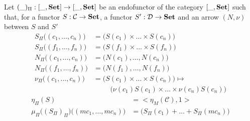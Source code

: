 \documentclass{report}
\newcommand{\prodmon}{\Pi}
\begin{document}
\begin{defn}[The monad $(\_)_\prodmon$]
    Let $(\_)_\prodmon : [\_, \bf Set] \rightarrow [\_,\bf Set]$ be an endofunctor of the category $ [\_, \bf Set] $ such that, for a functor $S : \mathcal{C} \rightarrow \bf Set$, a functor $S' : \mathcal{D} \rightarrow \bf Set$ and an arrow $(N,\nu)$ between $S$ and $S'$
    \begin{align*}
        S_\prodmon\big((c_1,\dots,c_n)\big)
         & = \big(S(c_1)\times\dots\times S(c_n)\big)          \\
        S_\prodmon\big((f_1,\dots,f_n)\big)
         & = \big(S(f_1)\times\dots\times S(f_n)\big)          \\
        N_\prodmon\big((c_1,\dots,c_n)\big)
         & = \big(N(c_1),\dots, N(c_n)\big)                    \\
        N_\prodmon\big((f_1,\dots,f_n)\big)
         & = \big(N(f_1),\dots, N(f_n)\big)                    \\
        \nu_\prodmon\big((c_1,\dots,c_n)\big)
         & = \big(S(c_1)\times\dots\times S(c_n)\big)  \mapsto \\
         & \hspace{1cm}
        \big(\nu(c_1) S(c_1)\times\dots\times \nu(c_n) S(c_n)\big)
    \end{align*}
    \begin{align*}
        \eta_\prodmon(S)                                                       & = \big<\eta_M(\mathcal{C}),\mathrm{1}\big>             \\
        \mu_\prodmon\big((S_\prodmon)_\prodmon\big)\big((mc_1,\dots,mc_n)\big) & =  \big(S_\prodmon(c_1)+ \dots + S_\prodmon(mc_n)\big) \\
    \end{align*}
\end{defn}
\end{document}
